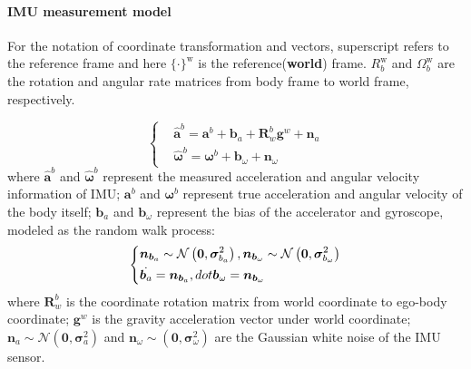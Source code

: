 \documentclass[12pt]{report}   %
\begin{document}
\paragraph{IMU measurement model}
For the notation of coordinate transformation and vectors, superscript refers to
the reference frame and here $\{\cdot\}^{\mathrm{w}}$ is the
reference(\textbf{world}) frame. $R_b^{\mathrm{w}}$ and $\Omega_b^{\mathrm{w}}$
are the rotation and angular rate matrices from body frame to world frame,
respectively.


\begin{equation}
	\left\{
	\begin{aligned}
	&\hat{\bm{a}}^b=\bm{a}^b+\bm{b}_a+\bm{R}_w^b\bm{g}^w+\bm{n}_a\\
	&\hat{\bm{\omega}}^b=\bm{\omega}^b+\bm{b}_\omega+\bm{n}_\omega
	\end{aligned}
	\right.
	\label{eq.measurement_model}
\end{equation}
where $\hat{\bm{a}}^b$ and $\hat{\bm{\omega}}^b$ represent the measured
acceleration and angular velocity information of IMU; $\bm{a}^b$ and
$\bm{\omega}^b$ represent true acceleration and angular velocity of the body
itself; $\bm{b}_a$ and $\bm{b}_\omega$ represent the bias of the accelerator and
gyroscope, modeled as the random walk process:
\begin{equation}
\centering
	\left\{
	\begin{aligned}
	&\bm{n}_{\bm{b}_a}\sim\mathcal{N}\left(\bm{0},\bm{\sigma}_{b_a}^2\right),\bm{n}_{\bm{b}_\omega}\sim\mathcal{N}\left(\bm{0},\bm{\sigma}_{b_\omega}^2\right)\\
	&\dot{\bm{b}_a}=\bm{n}_{\bm{b}_a},dot{\bm{b}_\omega}=\bm{n}_{\bm{b}_\omega}
	\end{aligned}
	\right.
	\label{eq.error_model}
\end{equation}
where $\bm{R}_w^b$ is the coordinate rotation matrix from world coordinate to
ego-body coordinate; $\bm{g}^w$ is the gravity acceleration vector under world
coordinate; $\bm{n}_a\sim\mathcal{N}\left(\bm{0},\bm{\sigma}_a^2\right)$ and
$\bm{n}_\omega\sim\left(\bm{0},\bm{\sigma}_\omega^2\right)$ are the Gaussian
white noise of the IMU sensor.
	
\end{document}
